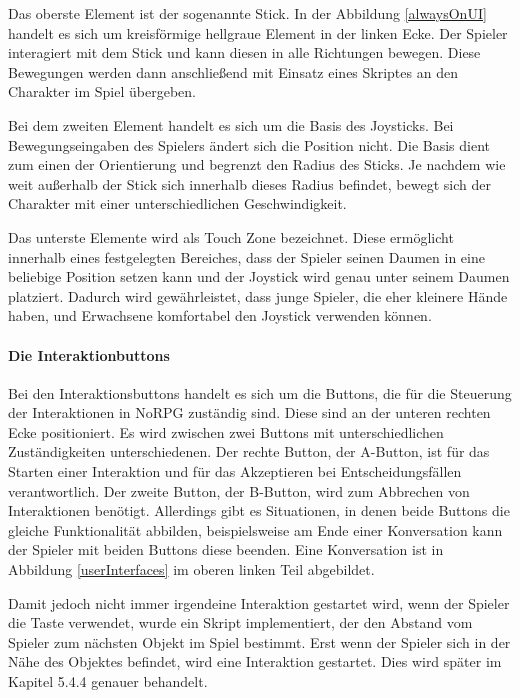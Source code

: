 					Das oberste Element ist der sogenannte Stick. In der Abbildung \ref{alwaysOnUI} handelt es sich um kreisförmige hellgraue Element in der linken Ecke. Der Spieler interagiert mit dem Stick und kann diesen in alle Richtungen bewegen. Diese Bewegungen werden dann anschließend mit Einsatz eines Skriptes an den Charakter im Spiel übergeben. 

					Bei dem zweiten Element handelt es sich um die Basis des Joysticks. Bei Bewegungseingaben des Spielers ändert sich die Position nicht. Die Basis dient zum einen der Orientierung und begrenzt den Radius des Sticks. Je nachdem wie weit außerhalb der Stick sich innerhalb dieses Radius befindet, bewegt sich der Charakter mit einer unterschiedlichen Geschwindigkeit.

					Das unterste Elemente wird als Touch Zone bezeichnet. Diese ermöglicht innerhalb eines festgelegten Bereiches, dass der Spieler seinen Daumen in eine beliebige Position setzen kann und der Joystick wird genau unter seinem Daumen platziert. Dadurch wird gewährleistet, dass junge Spieler, die eher kleinere Hände haben, und Erwachsene komfortabel den Joystick verwenden können.

				\paragraph{Die Interaktionbuttons}
					Bei den Interaktionsbuttons handelt es sich um die Buttons, die für die Steuerung der Interaktionen in NoRPG zuständig sind. Diese sind an der unteren rechten Ecke positioniert. Es wird zwischen zwei Buttons mit unterschiedlichen Zuständigkeiten unterschiedenen. Der rechte Button, der A-Button, ist für das Starten einer Interaktion und für das Akzeptieren bei Entscheidungsfällen verantwortlich. Der zweite Button, der B-Button, wird zum Abbrechen von Interaktionen benötigt. Allerdings gibt es Situationen, in denen beide Buttons die gleiche Funktionalität abbilden, beispielsweise am Ende einer Konversation kann der Spieler mit beiden Buttons diese beenden. Eine Konversation ist in Abbildung \ref{userInterfaces} im oberen linken Teil abgebildet.

					Damit jedoch nicht immer irgendeine Interaktion gestartet wird, wenn der Spieler die Taste verwendet, wurde ein Skript implementiert, der den Abstand vom Spieler zum nächsten Objekt im Spiel bestimmt. Erst wenn der Spieler sich in der Nähe des Objektes befindet, wird eine Interaktion gestartet. Dies wird später im Kapitel 5.4.4 genauer behandelt.

